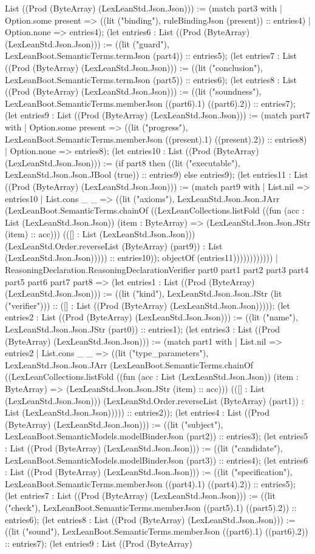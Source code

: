 \documentclass[11pt]{article}
\begin{document}
List ((Prod (ByteArray) (LexLeanStd.Json.Json))) := (match part3 with | Option.some present => ((lit ("binding"), ruleBindingJson (present)) :: entries4) | Option.none => entries4); (let entries6 : List ((Prod (ByteArray) (LexLeanStd.Json.Json))) := ((lit ("guard"), LexLeanBoot.SemanticTerms.termJson (part4)) :: entries5); (let entries7 : List ((Prod (ByteArray) (LexLeanStd.Json.Json))) := ((lit ("conclusion"), LexLeanBoot.SemanticTerms.termJson (part5)) :: entries6); (let entries8 : List ((Prod (ByteArray) (LexLeanStd.Json.Json))) := ((lit ("soundness"), LexLeanBoot.SemanticTerms.memberJson ((part6).1) ((part6).2)) :: entries7); (let entries9 : List ((Prod (ByteArray) (LexLeanStd.Json.Json))) := (match part7 with | Option.some present => ((lit ("progress"), LexLeanBoot.SemanticTerms.memberJson ((present).1) ((present).2)) :: entries8) | Option.none => entries8); (let entries10 : List ((Prod (ByteArray) (LexLeanStd.Json.Json))) := (if part8 then ((lit ("executable"), LexLeanStd.Json.Json.JBool (true)) :: entries9) else entries9); (let entries11 : List ((Prod (ByteArray) (LexLeanStd.Json.Json))) := (match part9 with | List.nil => entries10 | List.cons \_ \_ => ((lit ("axioms"), LexLeanStd.Json.Json.JArr (LexLeanBoot.SemanticTerms.chainOf ((LexLeanCollections.listFold ((fun (acc : List (LexLeanStd.Json.Json)) (item : ByteArray) => (LexLeanStd.Json.Json.JStr (item) :: acc))) (([] : List (LexLeanStd.Json.Json))) (LexLeanStd.Order.reverseList (ByteArray) (part9)) : List (LexLeanStd.Json.Json))))) :: entries10)); objectOf (entries11)))))))))))) | ReasoningDeclaration.ReasoningDeclarationVerifier part0 part1 part2 part3 part4 part5 part6 part7 part8 => (let entries1 : List ((Prod (ByteArray) (LexLeanStd.Json.Json))) := ((lit ("kind"), LexLeanStd.Json.Json.JStr (lit ("verifier"))) :: ([] : List ((Prod (ByteArray) (LexLeanStd.Json.Json))))); (let entries2 : List ((Prod (ByteArray) (LexLeanStd.Json.Json))) := ((lit ("name"), LexLeanStd.Json.Json.JStr (part0)) :: entries1); (let entries3 : List ((Prod (ByteArray) (LexLeanStd.Json.Json))) := (match part1 with | List.nil => entries2 | List.cons \_ \_ => ((lit ("type\_parameters"), LexLeanStd.Json.Json.JArr (LexLeanBoot.SemanticTerms.chainOf ((LexLeanCollections.listFold ((fun (acc : List (LexLeanStd.Json.Json)) (item : ByteArray) => (LexLeanStd.Json.Json.JStr (item) :: acc))) (([] : List (LexLeanStd.Json.Json))) (LexLeanStd.Order.reverseList (ByteArray) (part1)) : List (LexLeanStd.Json.Json))))) :: entries2)); (let entries4 : List ((Prod (ByteArray) (LexLeanStd.Json.Json))) := ((lit ("subject"), LexLeanBoot.SemanticModels.modelBinderJson (part2)) :: entries3); (let entries5 : List ((Prod (ByteArray) (LexLeanStd.Json.Json))) := ((lit ("candidate"), LexLeanBoot.SemanticModels.modelBinderJson (part3)) :: entries4); (let entries6 : List ((Prod (ByteArray) (LexLeanStd.Json.Json))) := ((lit ("specification"), LexLeanBoot.SemanticTerms.memberJson ((part4).1) ((part4).2)) :: entries5); (let entries7 : List ((Prod (ByteArray) (LexLeanStd.Json.Json))) := ((lit ("check"), LexLeanBoot.SemanticTerms.memberJson ((part5).1) ((part5).2)) :: entries6); (let entries8 : List ((Prod (ByteArray) (LexLeanStd.Json.Json))) := ((lit ("sound"), LexLeanBoot.SemanticTerms.memberJson ((part6).1) ((part6).2)) :: entries7); (let entries9 : List ((Prod (ByteArray) 
\end{document}
